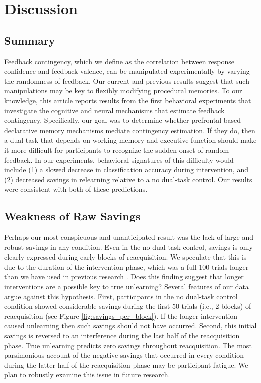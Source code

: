 \section*{Discussion}
\subsection*{Summary}
Feedback contingency, which we define as the correlation between response
confidence and feedback valence, can be manipulated experimentally by varying
the randomness of feedback. Our current and previous results
\cite{crossley_erasing_2013} suggest that such manipulations may be key to
flexibly modifying procedural memories. To our knowledge, this article reports
results from the first behavioral experiments that investigate the cognitive and
neural mechanisms that estimate feedback contingency. Specifically, our goal was
to determine whether prefrontal-based declarative memory mechanisms mediate
contingency estimation. If they do, then a dual task that depends on working
memory and executive function should make it more difficult for participants to
recognize the sudden onset of random feedback. In our experiments, behavioral
signatures of this difficulty would include (1) a slowed decrease in
classification accuracy during intervention, and (2) decreased savings in
relearning relative to a no dual-task control. Our results were consistent with
both of these predictions.

\subsection*{Weakness of Raw Savings}
Perhaps our most conspicuous and unanticipated result was the lack of large and
robust savings in any condition. Even in the no dual-task control, savings is
only clearly expressed during early blocks of reacquisition. We speculate that
this is due to the duration of the intervention phase, which was a full 100
trials longer than we have used in previous research
\cite{crossley_erasing_2013, crossley_renewal_2014}. Does this finding suggest
that longer interventions are a possible key to true unlearning? Several
features of our data argue against this hypothesis. First, participants in the
no dual-task control condition showed considerable savings during the first 50
trials (i.e., 2 blocks) of reacquisition (see Figure
\ref{fig:savings_per_block}). If the longer intervention caused unlearning then
such savings should not have occurred. Second, this initial savings is reversed
to an interference during the last half of the reacquisition phase. True
unlearning predicts zero savings throughout reacquisition. The most parsimonious
account of the negative savings that occurred in every condition during the
latter half of the reacquisition phase may be participant fatigue. We plan to
robustly examine this issue in future research.

